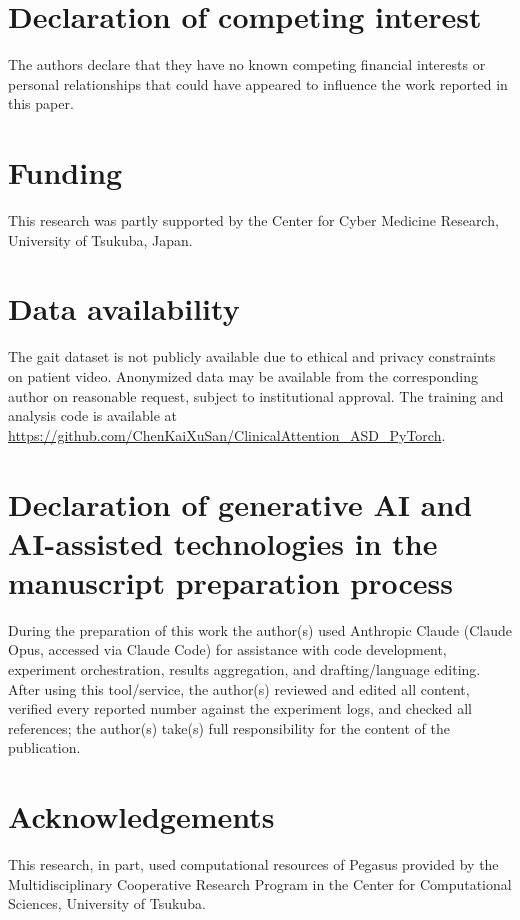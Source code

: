 \documentclass[review,authoryear,times]{elsarticle}
\begin{document}
\section*{Declaration of competing interest}
The authors declare that they have no known competing financial interests or
personal relationships that could have appeared to influence the work reported in
this paper.

\section*{Funding}
This research was partly supported by the Center for Cyber Medicine Research, University of Tsukuba, Japan.

\section*{Data availability}
The gait dataset is not publicly available due to ethical and privacy constraints
on patient video. Anonymized data may be available from the corresponding author
on reasonable request, subject to institutional approval. The training and
analysis code is available at
\url{https://github.com/ChenKaiXuSan/ClinicalAttention_ASD_PyTorch}.

\section*{Declaration of generative AI and AI-assisted technologies in the manuscript preparation process}
During the preparation of this work the author(s) used Anthropic Claude
(Claude Opus, accessed via Claude Code) for assistance with code development,
experiment
orchestration, results aggregation, and drafting/language editing. After using
this tool/service, the author(s) reviewed and edited all content, verified every
reported number against the experiment logs, and checked all references; the
author(s) take(s) full responsibility for the content of the publication.

\section*{Acknowledgements}
This research, in part, used computational resources of Pegasus provided by the Multidisciplinary Cooperative Research Program in the Center for Computational Sciences, University of Tsukuba.



\end{document}
